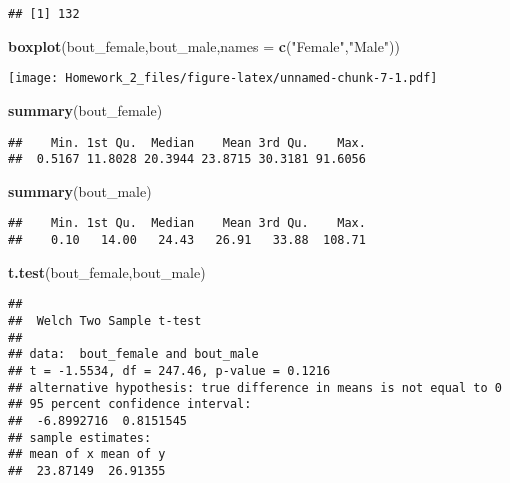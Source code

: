 \documentclass[]{article}
\newenvironment{Shaded}{\begin{snugshade}}{\end{snugshade}}
\newcommand{\KeywordTok}[1]{\textcolor[rgb]{0.13,0.29,0.53}{\textbf{#1}}}
\newcommand{\DataTypeTok}[1]{\textcolor[rgb]{0.13,0.29,0.53}{#1}}
\newcommand{\StringTok}[1]{\textcolor[rgb]{0.31,0.60,0.02}{#1}}
\newcommand{\NormalTok}[1]{#1}
\begin{document}
\begin{verbatim}
## [1] 132
\end{verbatim}

\begin{Shaded}
\begin{Highlighting}[]
\KeywordTok{boxplot}\NormalTok{(bout_female,bout_male,}\DataTypeTok{names =} \KeywordTok{c}\NormalTok{(}\StringTok{"Female"}\NormalTok{,}\StringTok{"Male"}\NormalTok{))}
\end{Highlighting}
\end{Shaded}

\texttt{[image: Homework\_2\_files/figure-latex/unnamed-chunk-7-1.pdf]}

\begin{Shaded}
\begin{Highlighting}[]
\KeywordTok{summary}\NormalTok{(bout_female)}
\end{Highlighting}
\end{Shaded}

\begin{verbatim}
##    Min. 1st Qu.  Median    Mean 3rd Qu.    Max. 
##  0.5167 11.8028 20.3944 23.8715 30.3181 91.6056
\end{verbatim}

\begin{Shaded}
\begin{Highlighting}[]
\KeywordTok{summary}\NormalTok{(bout_male)}
\end{Highlighting}
\end{Shaded}

\begin{verbatim}
##    Min. 1st Qu.  Median    Mean 3rd Qu.    Max. 
##    0.10   14.00   24.43   26.91   33.88  108.71
\end{verbatim}

\begin{Shaded}
\begin{Highlighting}[]
\KeywordTok{t.test}\NormalTok{(bout_female,bout_male)}
\end{Highlighting}
\end{Shaded}

\begin{verbatim}
## 
##  Welch Two Sample t-test
## 
## data:  bout_female and bout_male
## t = -1.5534, df = 247.46, p-value = 0.1216
## alternative hypothesis: true difference in means is not equal to 0
## 95 percent confidence interval:
##  -6.8992716  0.8151545
## sample estimates:
## mean of x mean of y 
##  23.87149  26.91355
\end{verbatim}
\end{document}

